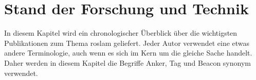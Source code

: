 %		
%		
%	
%		
%
\chapter{Stand der Forschung und Technik}

In diesem Kapitel wird ein chronologischer Überblick über die wichtigsten Publikationen zum Thema \Gls{roslam} geliefert. Jeder Autor verwendet eine etwas andere Terminologie, auch wenn es sich im Kern um die gleiche Sache handelt. Daher werden in diesem Kapitel die Begriffe Anker, Tag und Beacon synonym verwendet.


